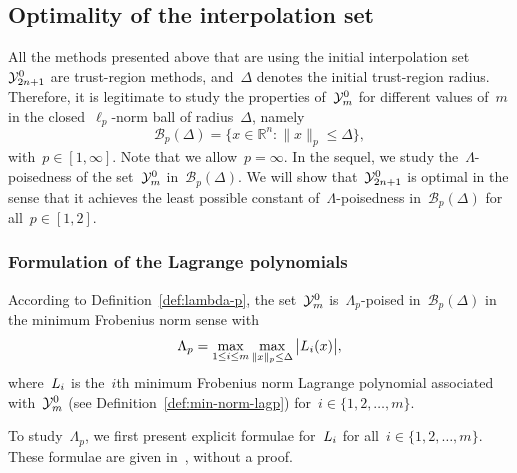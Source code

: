 \documentclass[draft]{article}
\numberwithin{equation}{section}
\theoremstyle{definition}
\theoremstyle{plain}
\newcommand*{\abs}[2][]{#1\lvert#2#1\rvert}
\newcommand*{\lagp}[1][]{L\ifblank{#1}{}{_{#1}}}
\newcommand*{\norm}[2][]{#1\lVert#2#1\rVert}
\newcommand*{\R}{\mathbb{R}}
\newcommand*{\set}[2][]{#1\{#2#1\}}
\newcommand*{\xpt}[1][]{\mathcal{Y}\ifblank{#1}{}{^{#1}}}
\begin{document}
\subsection{Optimality of the interpolation set}

All the methods presented above that are using the initial interpolation set~$\xpt[0]_{2n + 1}$ are trust-region methods, and~$\Delta$ denotes the initial trust-region radius.
Therefore, it is legitimate to study the properties of~$\xpt[0]_m$ for different values of~$m$ in the closed~$\ell_p$-norm ball of radius~$\Delta$, namely
\begin{equation*}
    \mathcal{B}_p(\Delta) = \set{x \in \R^n : \norm{x}_p \le \Delta},
\end{equation*}
with~$p \in [1, \infty]$.
Note that we allow~$p = \infty$.
In the sequel, we study the~$\Lambda$-poisedness of the set~$\xpt[0]_m$ in~$\mathcal{B}_p(\Delta)$.
We will show that~$\xpt[0]_{2n + 1}$ is optimal in the sense that it achieves the least possible constant of~$\Lambda$-poisedness in~$\mathcal{B}_p(\Delta)$ for all~$p \in [1, 2]$.

\subsubsection{Formulation of the Lagrange polynomials}

According to Definition~\ref{def:lambda-p}, the set~$\xpt[0]_m$ is~$\Lambda_p$-poised in~$\mathcal{B}_p(\Delta)$ in the minimum Frobenius norm sense with
\begin{equation*}
    \Lambda_p = \max_{1 \le i \le m} \max_{\norm{x}_p \le \Delta} \abs[\big]{\lagp[i](x)},
\end{equation*}
where~$\lagp[i]$ is the~$i$th minimum Frobenius norm Lagrange polynomial associated with~$\xpt[0]_m$ (see Definition~\ref{def:min-norm-lagp}) for~$i \in \set{1, 2, \dots, m}$.

To study~$\Lambda_p$, we first present explicit formulae for~$\lagp[i]$ for all~$i \in \set{1, 2, \dots, m}$.
These formulae are given in~\cite[\S~3]{Powell_2006}, without a proof.
\end{document}
